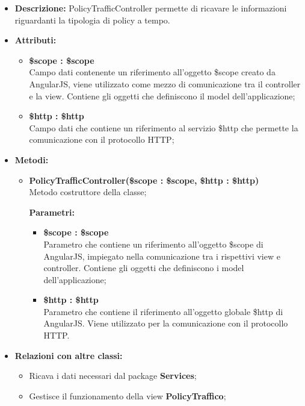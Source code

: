 \begin{itemize}
	\item \textbf{Descrizione:} PolicyTrafficController permette di ricavare le informazioni riguardanti la tipologia di policy a tempo.
	\item \textbf{Attributi:}
	\begin{itemize}
		
		\item \textbf{\$scope : \$scope}\\
		Campo dati contenente un riferimento all'oggetto \$scope creato da AngularJS, viene utilizzato come mezzo di comunicazione tra il controller e la view. Contiene gli oggetti che definiscono il model dell'applicazione;
		
		\item \textbf{\$http : \$http }\\
		Campo dati che contiene un riferimento al servizio \$http che permette la comunicazione con il protocollo HTTP;
		
	\end{itemize}
	\item \textbf{Metodi:}
	\begin{itemize}
		
		\item \textbf{PolicyTrafficController(\$scope : \$scope, \$http : \$http)}\\
		Metodo costruttore della classe;
		\begin{description}
			\item[\textbf{Parametri:}]
		\end{description}
		\begin{itemize}
			\item \textbf{\$scope : \$scope}\\
			Parametro che contiene un riferimento all'oggetto \$scope di AngularJS, impiegato nella comunicazione tra i rispettivi view e controller. Contiene gli oggetti che definiscono i model dell'applicazione;
			
			\item \textbf{\$http : \$http}\\
			Parametro che contiene il riferimento all'oggetto globale \$http di AngularJS. Viene utilizzato per la comunicazione con il protocollo HTTP.
			
		\end{itemize}				
	\end{itemize}
	\item \textbf{Relazioni con altre classi:}
	\begin{itemize}
		\item Ricava i dati necessari dal package \textbf{Services};
		\item Gestisce il funzionamento della view \textbf{PolicyTraffico};
	\end{itemize}
\end{itemize}

